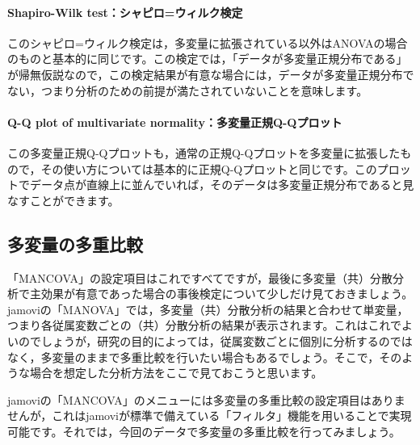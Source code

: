 \documentclass[
  12pt,
  a5jpaper,
  lualatex, ja=standard]{bxjsbook}
\begin{document}
\hypertarget{shapiro-wilk-testux30b7ux30e3ux30d4ux30edux30a6ux30a3ux30ebux30afux691cux5b9a}{%
\paragraph*{Shapiro-Wilk test：シャピロ=ウィルク検定}\label{shapiro-wilk-testux30b7ux30e3ux30d4ux30edux30a6ux30a3ux30ebux30afux691cux5b9a}}

このシャピロ=ウィルク検定は，多変量に拡張されている以外はANOVAの場合のものと基本的に同じです。この検定では，「データが多変量正規分布である」が帰無仮説なので，この検定結果が有意な場合には，データが多変量正規分布でない，つまり分析のための前提が満たされていないことを意味します。

\hypertarget{q-q-plot-of-multivariate-normalityux591aux5909ux91cfux6b63ux898fq-qux30d7ux30edux30c3ux30c8}{%
\paragraph*{Q-Q plot of multivariate normality：多変量正規Q-Qプロット}\label{q-q-plot-of-multivariate-normalityux591aux5909ux91cfux6b63ux898fq-qux30d7ux30edux30c3ux30c8}}

この多変量正規Q-Qプロットも，通常の正規Q-Qプロットを多変量に拡張したもので，その使い方については基本的に正規Q-Qプロットと同じです。このプロットでデータ点が直線上に並んでいれば，そのデータは多変量正規分布であると見なすことができます。

\hypertarget{sub:ANOVA-mancova-posthoc}{%
\subsection{多変量の多重比較}\label{sub:ANOVA-mancova-posthoc}}

「MANCOVA」の設定項目はこれですべてですが，最後に多変量（共）分散分析で主効果が有意であった場合の事後検定について少しだけ見ておきましょう。jamoviの「MANOVA」では，多変量（共）分散分析の結果と合わせて単変量，つまり各従属変数ごとの（共）分散分析の結果が表示されます。これはこれでよいのでしょうが，研究の目的によっては，従属変数ごとに個別に分析するのではなく，多変量のままで多重比較を行いたい場合もあるでしょう。そこで，そのような場合を想定した分析方法をここで見ておこうと思います。

jamoviの「MANCOVA」のメニューには多変量の多重比較の設定項目はありませんが，これはjamoviが標準で備えている「フィルタ」機能を用いることで実現可能です。それでは，今回のデータで多変量の多重比較を行ってみましょう。
\end{document}
